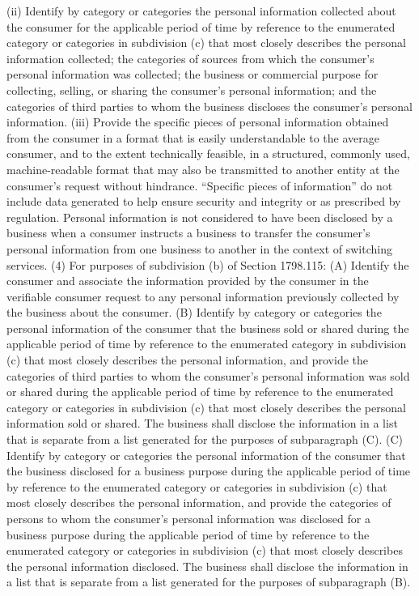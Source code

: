 (ii) Identify by category or categories the personal information collected about the consumer for the applicable period of time by reference to the enumerated category or categories in subdivision (c) that most closely describes the personal information collected; the categories of sources from which the consumer’s personal information was collected; the business or commercial purpose for collecting, selling, or sharing the consumer’s personal information; and the categories of third parties to whom the business discloses the consumer’s personal information.
(iii) Provide the specific pieces of personal information obtained from the consumer in a format that is easily understandable to the average consumer, and to the extent technically feasible, in a structured, commonly used, machine-readable format that may also be transmitted to another entity at the consumer’s request without hindrance. “Specific pieces of information” do not include data generated to help ensure security and integrity or as prescribed by regulation. Personal information is not considered to have been disclosed by a business when a consumer instructs a business to transfer the consumer’s personal information from one business to another in the context of switching services.
(4) For purposes of subdivision (b) of Section 1798.115:
(A) Identify the consumer and associate the information provided by the consumer in the verifiable consumer request to any personal information previously collected by the business about the consumer.
(B) Identify by category or categories the personal information of the consumer that the business sold or shared during the applicable period of time by reference to the enumerated category in subdivision (c) that most closely describes the personal information, and provide the categories of third parties to whom the consumer’s personal information was sold or shared during the applicable period of time by reference to the enumerated category or categories in subdivision (c) that most closely describes the personal information sold or shared. The business shall disclose the information in a list that is separate from a list generated for the purposes of subparagraph (C).
(C) Identify by category or categories the personal information of the consumer that the business disclosed for a business purpose during the applicable period of time by reference to the enumerated category or categories in subdivision (c) that most closely describes the personal information, and provide the categories of persons to whom the consumer’s personal information was disclosed for a business purpose during the applicable period of time by reference to the enumerated category or categories in subdivision (c) that most closely describes the personal information disclosed. The business shall disclose the information in a list that is separate from a list generated for the purposes of subparagraph (B).
